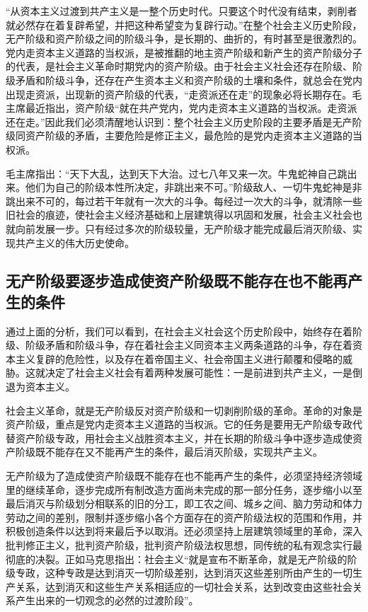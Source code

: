 \documentclass{book}
\begin{document}
“从资本主义过渡到共产主义是一整个历史时代。只要这个时代没有结束，剥削者就必然存在着复辟希望，并把这种希望变为复辟行动。”在整个社会主义历史阶段，无产阶级和资产阶级之间的阶级斗争，是长期的、曲折的，有时甚至是很激烈的。党内走资本主义道路的当权派，是被推翻的地主资产阶级和新产生的资产阶级分子的代表，是社会主义革命时期党内的资产阶级。由于社会主义社会还存在阶级、阶级矛盾和阶级斗争，还存在产生资本主义和资产阶级的土壤和条件，就总会在党内出现走资派，出现新的资产阶级的代表，“走资派还在走”的现象必将长期存在。毛主席最近指出，资产阶级“就在共产党内，党内走资本主义道路的当权派。走资派还在走。”因此我们必须清醒地认识到：整个社会主义历史阶段的主要矛盾是无产阶级同资产阶级的矛盾，主要危险是修正主义，最危险的是党内走资本主义道路的当权派。

毛主席指出：“天下大乱，达到天下大治。过七八年又来一次。牛鬼蛇神自己跳出来。他们为自己的阶级本性所决定，非跳出来不可。”阶级敌人、一切牛鬼蛇神是非跳出来不可的，每过若干年就有一次大的斗争。每经过一次大的斗争，就清除一些旧社会的痕迹，使社会主义经济基础和上层建筑得以巩固和发展，社会主义社会也就向前发展一步。只有经过多次的阶级较量，无产阶级才能完成最后消灭阶级、实现共产主义的伟大历史使命。

\subsection{无产阶级要逐步造成使资产阶级既不能存在也不能再产生的条件}

通过上面的分析，我们可以看到，在社会主义社会这个历史阶段中，始终存在着阶级、阶级矛盾和阶级斗争，存在着社会主义同资本主义两条道路的斗争，存在着资本主义复辟的危险性，以及存在着帝国主义、社会帝国主义进行颠覆和侵略的威胁。这就决定了社会主义社会有着两种发展可能性：一是前进到共产主义，一是倒退为资本主义。

社会主义革命，就是无产阶级反对资产阶级和一切剥削阶级的革命。革命的对象是资产阶级，重点是党内走资本主义道路的当权派。它的任务是要用无产阶级专政代替资产阶级专政，用社会主义战胜资本主义，并在长期的阶级斗争中逐步造成使资产阶级既不能存在又不能再产生的条件，最后消灭阶级，实现共产主义。

无产阶级为了造成使资产阶级既不能存在也不能再产生的条件，必须坚持经济领域里的继续革命，逐步完成所有制改造方面尚未完成的那一部分任务，逐步缩小以至最后消灭与阶级划分相联系的旧的分工，即工农之间、城乡之间、脑力劳动和体力劳动之间的差别，限制并逐步缩小各个方面存在的资产阶级法权的范围和作用，并积极创造条件以达到将来最后予以取消。还必须坚持上层建筑领域里的革命，深入批判修正主义，批判资产阶级，批判资产阶级法权思想，同传统的私有观念实行最彻底的决裂。正如马克思指出：社会主义“就是宣布不断革命，就是无产阶级的阶级专政，这种专政是达到消灭一切阶级差别，达到消灭这些差别所由产生的一切生产关系，达到消灭和这些生产关系相适应的一切社会关系，达到改变由这些社会关系产生出来的一切观念的必然的过渡阶段”。
\end{document}
